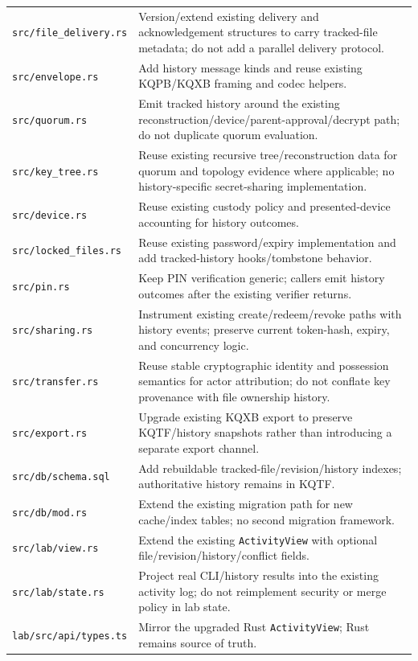 \documentclass[11pt]{article}
\begin{document}
{\begin{tabularx}{\textwidth}{
  >{\raggedright\arraybackslash}p{}
  >{\raggedright\arraybackslash}X
}
\texttt{src/file\_delivery.rs} & Version/extend existing delivery and acknowledgement structures to carry tracked-file metadata; do not add a parallel delivery protocol. \\
\texttt{src/envelope.rs} & Add history message kinds and reuse existing KQPB/KQXB framing and codec helpers. \\
\texttt{src/quorum.rs} & Emit tracked history around the existing reconstruction/device/parent-approval/decrypt path; do not duplicate quorum evaluation. \\
\texttt{src/key\_tree.rs} & Reuse existing recursive tree/reconstruction data for quorum and topology evidence where applicable; no history-specific secret-sharing implementation. \\
\texttt{src/device.rs} & Reuse existing custody policy and presented-device accounting for history outcomes. \\
\texttt{src/locked\_files.rs} & Reuse existing password/expiry implementation and add tracked-history hooks/tombstone behavior. \\
\texttt{src/pin.rs} & Keep PIN verification generic; callers emit history outcomes after the existing verifier returns. \\
\texttt{src/sharing.rs} & Instrument existing create/redeem/revoke paths with history events; preserve current token-hash, expiry, and concurrency logic. \\
\texttt{src/transfer.rs} & Reuse stable cryptographic identity and possession semantics for actor attribution; do not conflate key provenance with file ownership history. \\
\texttt{src/export.rs} & Upgrade existing KQXB export to preserve KQTF/history snapshots rather than introducing a separate export channel. \\
\texttt{src/db/schema.sql} & Add rebuildable tracked-file/revision/history indexes; authoritative history remains in KQTF. \\
\texttt{src/db/mod.rs} & Extend the existing migration path for new cache/index tables; no second migration framework. \\
\texttt{src/lab/view.rs} & Extend the existing \texttt{ActivityView} with optional file/revision/history/conflict fields. \\
\texttt{src/lab/state.rs} & Project real CLI/history results into the existing activity log; do not reimplement security or merge policy in lab state. \\
\texttt{lab/src/api/types.ts} & Mirror the upgraded Rust \texttt{ActivityView}; Rust remains source of truth. \\

\end{tabularx}}
\end{document}
